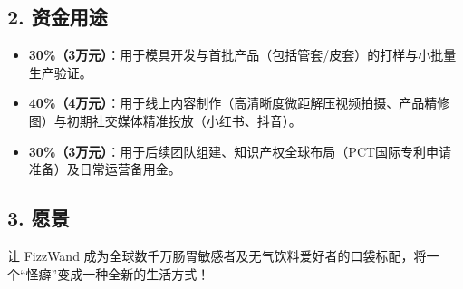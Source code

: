 \documentclass[a4paper,12pt]{ctexart}
\begin{document}
\subsection{2. 资金用途}
\begin{itemize}
    \item \textbf{30\%（3万元）}：用于模具开发与首批产品（包括管套/皮套）的打样与小批量生产验证。
    \item \textbf{40\%（4万元）}：用于线上内容制作（高清晰度微距解压视频拍摄、产品精修图）与初期社交媒体精准投放（小红书、抖音）。
    \item \textbf{30\%（3万元）}：用于后续团队组建、知识产权全球布局（PCT国际专利申请准备）及日常运营备用金。
\end{itemize}

\subsection{3. 愿景}
让 FizzWand 成为全球数千万肠胃敏感者及无气饮料爱好者的口袋标配，将一个“怪癖”变成一种全新的生活方式！
\end{document}

